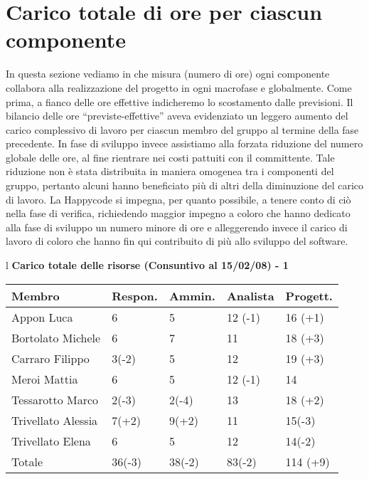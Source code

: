 \newpage

\section{Carico totale di ore per ciascun componente}
In questa sezione vediamo in che misura (numero di ore) ogni componente collabora alla 
realizzazione del progetto in ogni macrofase e globalmente. Come prima, a fianco delle ore effettive indicheremo lo scostamento dalle previsioni.
Il bilancio delle ore ``previste-effettive'' aveva evidenziato un leggero aumento del carico complessivo di lavoro per ciascun membro del gruppo al termine della fase precedente. In fase di sviluppo invece assistiamo alla forzata riduzione del numero globale delle ore, al fine rientrare nei costi pattuiti con il committente. Tale riduzione non \`e stata distribuita in maniera omogenea tra i componenti del gruppo, pertanto alcuni hanno beneficiato pi\`u di altri della diminuzione del carico di lavoro. La Happycode si impegna, per quanto possibile, a tenere conto di ci\`o nella fase di verifica, richiedendo maggior impegno a coloro che hanno dedicato alla fase di sviluppo un numero minore di ore e alleggerendo invece il carico di lavoro di coloro che hanno fin qui contribuito di pi\`u allo sviluppo del software.


\begin{table}[hbtp]
\large{
\begin{tabular}{l}
\Large{\textbf{\textsf{Carico totale delle risorse (Consuntivo al 15/02/08) - 1}}} \\

\begin{tabular}{||p{3.5cm}||p{2cm}||p{2cm}||p{2cm}||p{2cm}||}
\hline
\textbf{Membro} & \textbf{Respon.} & \textbf{Ammin.} & \textbf{Analista}
& \textbf{Progett.}\\
\hline
{Appon Luca}&6&5&12 \footnotesize{(-1)}&16 \footnotesize{(+1)} \\ 
\hline 
{Bortolato Michele} &6&7&11&18 \footnotesize{(+3)}\\ 
\hline
{Carraro Filippo}&3\footnotesize{(-2)}&5&12&19 \footnotesize{(+3)} \\
\hline
{Meroi Mattia}&6&5&12 \footnotesize{(-1)}&14\\
\hline
{Tessarotto Marco} &2\footnotesize{(-3)}&2\footnotesize{(-4)}&13&18 \footnotesize{(+2)}\\
\hline
{Trivellato Alessia} &7\footnotesize{(+2)}&9\footnotesize{(+2)}&11&15\footnotesize{(-3)} \\
\hline
{Trivellato Elena} &6&5&12&14\footnotesize{(-2)} \\
\hline
{Totale}& 36\footnotesize{(-3)}&38\footnotesize{(-2)}&83\footnotesize{(-2)}&114 \footnotesize{(+9)} \\
\hline



\end{tabular} \\
\end{tabular}
}
\end{table}

